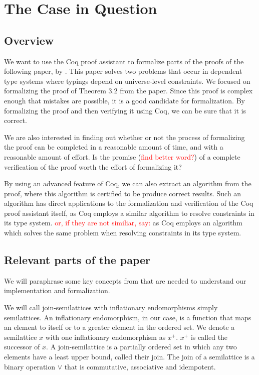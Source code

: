 \chapter{The Case in Question}
\label{ch:the_case_in_question}

\section{Overview}
\label{sec:overview}

We want to use the Coq proof assistant to formalize parts of the proofs of the following paper, by \citeauthor{mbezem} \cite{mbezem}.
This paper solves two problems that occur in dependent type systems where typings depend
on universe-level constraints. We focused on formalizing the proof of Theorem 3.2 from the paper.
Since this proof is complex enough that mistakes are possible, it is a good candidate for formalization.
By formalizing the proof and then verifying it using Coq, we can be sure that it is correct.

We are also interested in finding out whether or not the process of formalizing the proof
can be completed in a reasonable amount of time, and with a reasonable amount of effort.
Is the promise (\textcolor{red}{find better word?}) of a complete verification of the proof worth the effort of formalizing it?

By using an advanced feature of Coq, we can also extract an algorithm from the proof,
where this algorithm is certified to be produce correct results.
Such an algorithm has direct applications to the formalization and verification of the Coq proof assistant itself,
as Coq employs a similar algorithm to resolve constraints in its type system.
\textcolor{red}{or, if they are not similiar, say:}
as Coq employs an algorithm which solves the same problem when resolving constraints in its type system.

\section{Relevant parts of the paper}
\label{sec:relevant_parts_of_the_paper}

We will paraphrase some key concepts from \cite{mbezem} that are needed to understand
our implementation and formalization.

We will call join-semilattices with inflationary endomorphisms simply semilattices.
An inflationary endomorphism, in our case, is a function
that maps an element to itself or to a greater element in the ordered set.
We denote a semilattice $x$ with one inflationary endomorphism as $x^+$.
$x^+$ is called the successor of $x$.
A join-semilattice is a partially ordered set in which any two elements have a least upper bound,
called their join.
The join of a semilattice is a binary operation $\lor$ that is commutative, associative and idempotent.

